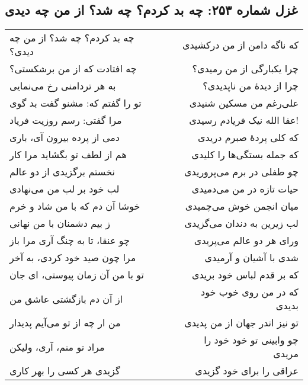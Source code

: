 \begin{center}
\section*{غزل شماره ۲۵۳: چه بد کردم؟ چه شد؟ از من چه دیدی}
\label{sec:253}
\begin{longtable}{l p{0.5cm} r}
چه بد کردم؟ چه شد؟ از من چه دیدی؟
&&
که ناگه دامن از من درکشیدی
\\
چه افتادت که از من برشکستی؟
&&
چرا یکبارگی از من رمیدی؟
\\
به هر تردامنی رخ می‌نمایی
&&
چرا از دیدهٔ من ناپدیدی؟
\\
تو را گفتم که: مشنو گفت بد گوی
&&
علی‌رغم من مسکین شنیدی
\\
مرا گفتی: رسم روزیت فریاد
&&
عفا الله نیک فریادم رسیدی!
\\
دمی از پرده بیرون آی، باری
&&
که کلی پردهٔ صبرم دریدی
\\
هم از لطف تو بگشاید مرا کار
&&
که جمله بستگی‌ها را کلیدی
\\
نخستم برگزیدی از دو عالم
&&
چو طفلی در برم می‌پروریدی
\\
لب خود بر لب من می‌نهادی
&&
حیات تازه در من می‌دمیدی
\\
خوشا آن دم که با من شاد و خرم
&&
میان انجمن خوش می‌چمیدی
\\
ز بیم دشمنان با من نهانی
&&
لب زیرین به دندان می‌گزیدی
\\
چو عنقا، تا به چنگ آری مرا باز
&&
ورای هر دو عالم می‌پریدی
\\
مرا چون صید خود کردی، به آخر
&&
شدی با آشیان و آرمیدی
\\
تو با من آن زمان پیوستی، ای جان
&&
که بر قدم لباس خود بریدی
\\
از آن دم بازگشتی عاشق من
&&
که در من روی خوب خود بدیدی
\\
من ار چه از تو می‌آیم پدیدار
&&
تو نیز اندر جهان از من پدیدی
\\
مراد تو منم، آری، ولیکن
&&
چو وابینی تو خود خود را مریدی
\\
گزیدی هر کسی را بهر کاری
&&
عراقی را برای خود گزیدی
\\
\end{longtable}
\end{center}
